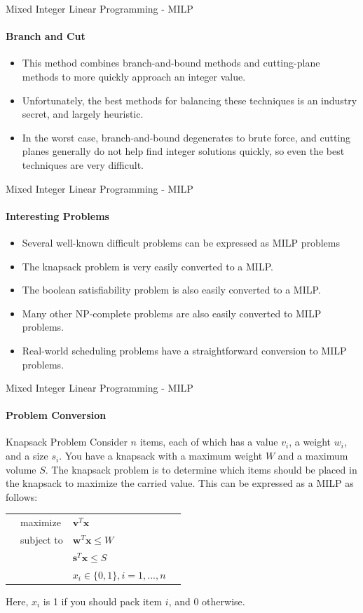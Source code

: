 \documentclass{beamer}
\renewcommand{\vec}{\mathbf}
\begin{document}
	\begin{frame}{Mixed Integer Linear Programming - MILP}
		\framesubtitle{Branch and Cut}
		\begin{itemize}
			\item This method combines branch-and-bound methods and cutting-plane methods to more quickly approach an integer value.
			\item Unfortunately, the best methods for balancing these techniques is an industry secret, and largely heuristic.
			\item In the worst case, branch-and-bound degenerates to brute force, and cutting planes generally do not help find integer solutions quickly, so even the best techniques are very difficult.
		\end{itemize}
	\end{frame}
	
	\begin{frame}{Mixed Integer Linear Programming - MILP}
		\framesubtitle{Interesting Problems}
		\begin{itemize}
			\item Several well-known difficult problems can be expressed as MILP problems
			\item The knapsack problem is very easily converted to a MILP.
			\item The boolean satisfiability problem is also easily converted to a MILP. 
			\item Many other NP-complete problems are also easily converted to MILP problems.
			\item Real-world scheduling problems have a straightforward conversion to MILP problems. 
		\end{itemize}
	\end{frame}

	\begin{frame}{Mixed Integer Linear Programming - MILP}
		\framesubtitle{Problem Conversion}
		\begin{block}{Knapsack Problem}
			Consider $n$ items, each of which has a value $v_i$, a weight $w_i$, and a size $s_i$. You have a knapsack with a maximum weight $W$ and a maximum volume $S$. The knapsack problem is to determine which items should be placed in the knapsack to maximize the carried value. This can be expressed as a MILP as follows:
			\begin{tabularx}{\textwidth}{X l l X}
				& maximize		& $\vec{v}^T\vec{x}$	& \\
				& subject to	& $\vec{w}^T\vec{x} \leq W$	& \\
				& 				& $\vec{s}^T\vec{x} \leq S$ & \\
				& 				& $x_i\in\{0,1\}, i=1,...,n$ &
			\end{tabularx}
			Here, $x_i$ is 1 if you should pack item $i$, and 0 otherwise.
		\end{block}
	\end{frame}
	
\end{document}
